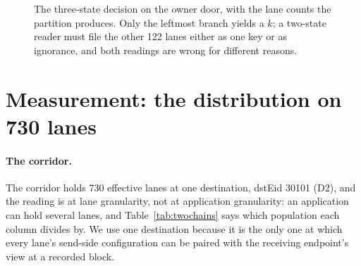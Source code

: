 \documentclass[10pt,a4paper]{article}
\begin{document}
\begin{figure}[t]
\centering
{}
\caption{The three-state decision on the owner door, with the lane counts the partition produces. Only the
leftmost branch yields a $k$; a two-state reader must file the other 122 lanes either as one key or as
ignorance, and both readings are wrong for different reasons.}
\label{fig:states}
\end{figure}
\section{Measurement: the distribution on 730 lanes}
\label{sec:measurement}

\paragraph{The corridor.}
The corridor holds 730 effective lanes at one destination, dstEid 30101 (D2), and the reading is
at lane granularity, not at application granularity: an application can hold several lanes, and Table~\ref{tab:twochains}
says which population each column divides by. We use one destination because it is the only one at
which every lane's send-side configuration can be paired with the receiving endpoint's view at a
recorded block.
\end{document}
